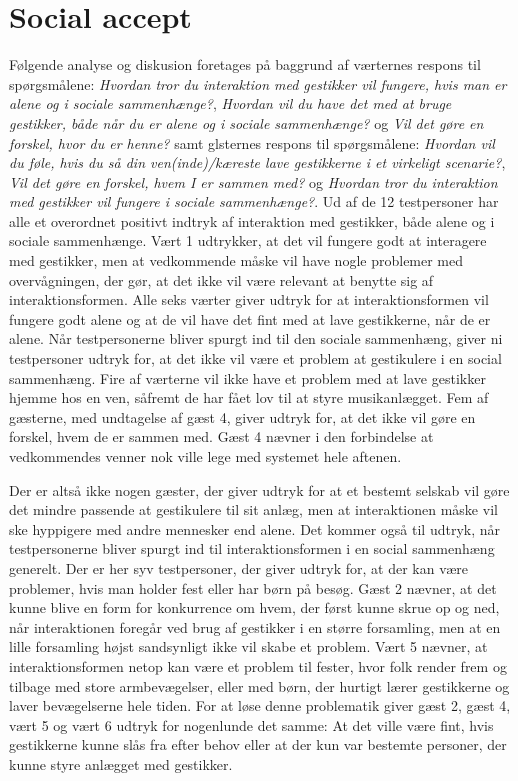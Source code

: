 \section{Social accept}
\label{TestresultaterSocialAcceptSocial}
%
Følgende analyse og diskusion foretages på baggrund af værternes respons til spørgsmålene: \textit{Hvordan tror du interaktion med gestikker vil fungere, hvis man er alene og i sociale sammenhænge?}, \textit{Hvordan vil du have det med at bruge gestikker, både når du er alene og i sociale sammenhænge?} og \textit{Vil det gøre en forskel, hvor du er henne?} samt glsternes respons til spørgsmålene: \textit{Hvordan vil du føle, hvis du så din ven(inde)/kæreste lave gestikkerne i et virkeligt scenarie?}, \textit{Vil det gøre en forskel, hvem I er sammen med?} og \textit{Hvordan tror du interaktion med gestikker vil fungere i sociale sammenhænge?}. \blankline
%
Ud af de 12 testpersoner har alle et overordnet positivt indtryk af interaktion med gestikker, både alene og i sociale sammenhænge. Vært 1 udtrykker, at det vil fungere godt at interagere med gestikker, men at vedkommende måske vil have nogle problemer med overvågningen, der gør, at det ikke vil være relevant at benytte sig af interaktionsformen. Alle seks værter giver udtryk for at interaktionsformen vil fungere godt alene og at de vil have det fint med at lave gestikkerne, når de er alene. Når testpersonerne bliver spurgt ind til den sociale sammenhæng, giver ni testpersoner udtryk for, at det ikke vil være et problem at gestikulere i en social sammenhæng. Fire af værterne vil ikke have et problem med at lave gestikker hjemme hos en ven, såfremt de har fået lov til at styre musikanlægget. Fem af gæsterne, med undtagelse af gæst 4, giver udtryk for, at det ikke vil gøre en forskel, hvem de er sammen med. Gæst 4 nævner i den forbindelse at vedkommendes venner nok ville lege med systemet hele aftenen. 

Der er altså ikke nogen gæster, der giver udtryk for at et bestemt selskab vil gøre det mindre passende at gestikulere til sit anlæg, men at interaktionen måske vil ske hyppigere med andre mennesker end alene. Det kommer også til udtryk, når testpersonerne bliver spurgt ind til interaktionsformen i en social sammenhæng generelt. Der er her syv testpersoner, der giver udtryk for, at der kan være problemer, hvis man holder fest eller har børn på besøg. Gæst 2 nævner, at det kunne blive en form for konkurrence om hvem, der først kunne skrue op og ned, når interaktionen foregår ved brug af gestikker i en større forsamling, men at en lille forsamling højst sandsynligt ikke vil skabe et problem. Vært 5 nævner, at interaktionsformen netop kan være et problem til fester, hvor folk render frem og tilbage med store armbevægelser, eller med børn, der hurtigt lærer gestikkerne og laver bevægelserne hele tiden. For at løse denne problematik giver gæst 2, gæst 4, vært 5 og vært 6 udtryk for nogenlunde det samme: At det ville være fint, hvis gestikkerne kunne slås fra efter behov eller at der kun var bestemte personer, der kunne styre anlægget med gestikker. 

